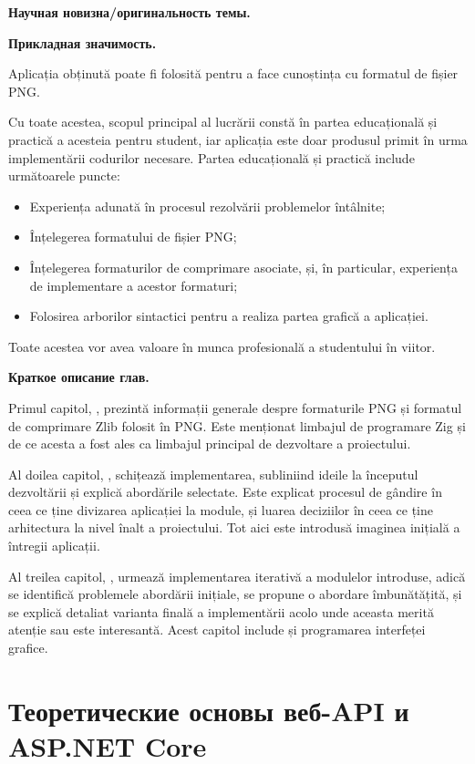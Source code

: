 \documentclass[a4paper,12pt]{report}
\begin{document}
\textbf{Научная новизна/оригинальность темы.}


\textbf{Прикладная значимость.}

Aplicația obținută poate fi folosită pentru a face cunoștința cu formatul de fișier \acs{PNG}.

Cu toate acestea, scopul principal al lucrării constă
în partea educațională și practică a acesteia pentru student,
iar aplicația este doar produsul primit în urma implementării codurilor necesare.
Partea educațională și practică include următoarele puncte:
\begin{itemize}
    \item Experiența adunată în procesul rezolvării problemelor întâlnite;
    \item Înțelegerea formatului de fișier \acs{PNG};
    \item
        Înțelegerea formaturilor de comprimare asociate,
        și, în particular, experiența de implementare a acestor formaturi;
    \item Folosirea arborilor sintactici pentru a realiza partea grafică a aplicației.
\end{itemize}

Toate acestea vor avea valoare în munca profesională a studentului în viitor.


\textbf{Краткое описание глав.}

Primul capitol, , prezintă informații generale despre
formaturile \acs{PNG} și formatul de comprimare Zlib folosit în \acs{PNG}.
Este menționat limbajul de programare Zig și de ce acesta a fost ales
ca limbajul principal de dezvoltare a proiectului.

Al doilea capitol, , schițează implementarea,
subliniind ideile la începutul dezvoltării și explică abordările selectate.
Este explicat procesul de gândire în ceea ce ține divizarea aplicației la module,
și luarea deciziilor în ceea ce ține arhitectura la nivel înalt a proiectului.
Tot aici este introdusă imaginea inițială a întregii aplicații.

Al treilea capitol, ,
urmează implementarea iterativă a modulelor introduse,
adică se identifică problemele abordării inițiale,
se propune o abordare îmbunătățită, și se explică detaliat varianta finală a implementării
acolo unde aceasta merită atenție sau este interesantă.
Acest capitol include și programarea interfeței grafice.

\chapter{Теоретические основы веб-API и ASP.NET Core}\label{intro_chapter_title}
\end{document}

